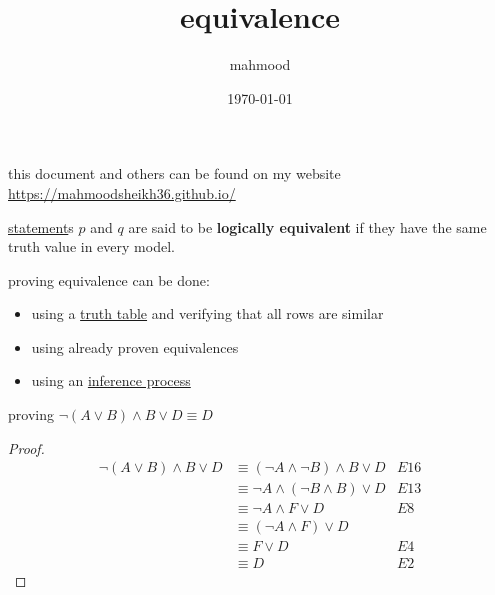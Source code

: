 \documentclass[a4paper,12pt]{article}
\author{mahmood}
\date{\today}
\title{equivalence}
\begin{document}
\maketitle
\begin{note}
this document and others can be found on my website\\
\url{https://mahmoodsheikh36.github.io/}
\end{note}
\begin{definition}
\href{20230401175139-statement.org}{statement}s \(p\) and \(q\) are said to be \textbf{logically equivalent} if they have the same truth value in every model.\\
\end{definition}
proving equivalence can be done:\\
\begin{itemize}
\item using a \href{20230116122956-truth_table.org}{truth table} and verifying that all rows are similar\\
\item using already proven equivalences\\
\item using an \href{20230525071323-formal_proof.org}{inference process}\\
\end{itemize}
\begin{my_example}
proving \(\lnot (A \lor B) \land B \lor D \equiv D\)\\
\begin{proof}
\begin{align*}
  \lnot (A \lor B) \land B \lor D &\equiv (\lnot A \land \lnot B) \land B \lor D & E16\\
  &\equiv \lnot A \land (\lnot B \land B) \lor D & E13\\
  &\equiv \lnot A \land F \lor D & E8\\
  &\equiv (\lnot A \land F) \lor D\\
  &\equiv F \lor D & E4\\
  &\equiv D & E2
\end{align*}
\end{proof}
\end{my_example}
\end{document}
